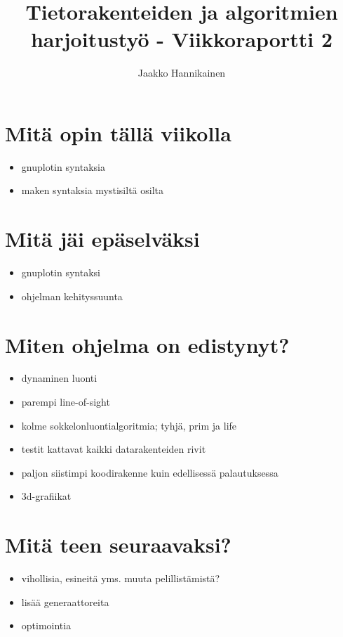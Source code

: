 \documentclass{article}
\author{Jaakko Hannikainen}
\title{Tietorakenteiden ja algoritmien harjoitustyö - Viikkoraportti 2}
\begin{document}
\maketitle

\section{Mitä opin tällä viikolla}
\begin{itemize}
    \item gnuplotin syntaksia
    \item maken syntaksia mystisiltä osilta
\end{itemize}

\section{Mitä jäi epäselväksi}
\begin{itemize}
    \item gnuplotin syntaksi
    \item ohjelman kehityssuunta
\end{itemize}

\section{Miten ohjelma on edistynyt?}
\begin{itemize}
    \item dynaminen luonti
    \item parempi line-of-sight
    \item kolme sokkelonluontialgoritmia; tyhjä, prim ja life
    \item testit kattavat kaikki datarakenteiden rivit
    \item paljon siistimpi koodirakenne kuin edellisessä palautuksessa
    \item 3d-grafiikat
\end{itemize}

\section{Mitä teen seuraavaksi?}
\begin{itemize}
    \item vihollisia, esineitä yms. muuta pelillistämistä?
    \item lisää generaattoreita
    \item optimointia
\end{itemize}

\texttt{}
\end{document}
